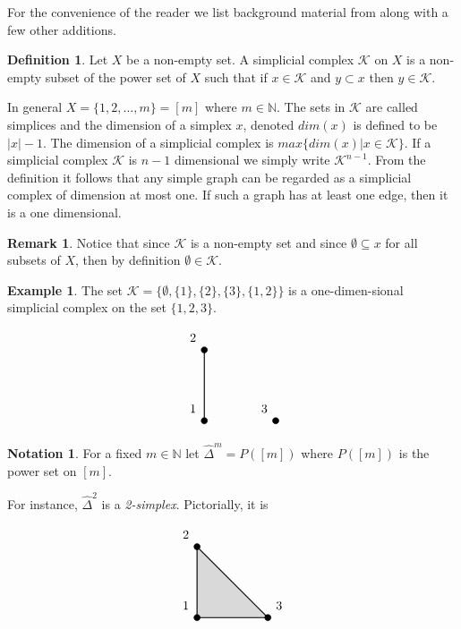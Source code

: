 \documentclass[oneside,12pt]{amsart}
\theoremstyle{definition}
\newtheorem{Definition}[Theorem]{Definition}
\newtheorem{Notation}[Theorem]{Notation}
\newtheorem{Remark}[Theorem]{Remark}
\newtheorem{Example}[Theorem]{Example}
\numberwithin{equation}{section}
\begin{document}
For the convenience of the reader we list background material from \cite{ALDH} along with a few other additions.
\begin{Definition}
Let $X$ be a non-empty set. A simplicial complex $\mathcal{K}$ on $X$ is a non-empty subset of the power set of $X$ such that if $x\in \mathcal{K}$ and $y\subset x$ then $y\in \mathcal{K}$.
\end{Definition}

In general $X=\{1,2,\ldots,m\}=[m]$ where $m\in \mathbb{N}$. The sets in $\mathcal{K}$ are called simplices and the dimension of a simplex $x$, denoted $dim(x)$ is defined to be $|x|-1$. The dimension of a simplicial complex is $max\{dim(x)|x\in \mathcal{K}\}$.  If a simplicial complex $\mathcal{K}$ is $n-1$ dimensional we simply write $\mathcal{K}^{n-1}$.  From the definition it follows that any simple graph can be regarded as a simplicial complex of dimension at most one.  If such a graph has at least one edge, then it is a one dimensional.

\begin{Remark}
Notice that since $\mathcal{K}$ is a non-empty set and since $\emptyset \subseteq x$ for all subsets of $X$, then by definition $\emptyset\in \mathcal{K}$.
\end{Remark}

\begin{Example}\label{E1}
The set $\mathcal{K}=\{\emptyset,\{1\},\{2\},\{3\},\{1,2\}\}$ is a one-dimen-sional simplicial complex on the set $\{1,2,3\}$.\\
\begin{minipage}{\linewidth}
$$\begin{tikzpicture}
\filldraw [black] (-10,0) node[above left =3pt]{$1$} circle (2.5pt);  %
\filldraw [black] (-10,2) node[above left =3pt]{$2$} circle (2.5pt);  %
\draw[thick] (-10,0) -- (-10,2);
\filldraw [black] (-8,0) node[above left =3pt]{$3$} circle (2.5pt);
\end{tikzpicture}$$
        \end{minipage}
\end{Example}

\begin{Notation}
For a fixed $m\in \mathbb{N}$ let $\widehat{\Delta}^m=P([m])$ where $P([m])$ is the power set on $[m]$.
\end{Notation}
 For instance, $\widehat{\Delta}^2$ is a \textit{2-simplex}.  Pictorially, it is

\begin{minipage}{\linewidth}
$$\begin{tikzpicture}
\filldraw[thick,gray!30]  (-10,0) -- (-10,2)--(-8,0)--(-10,0);
\draw[thick]  (-10,0) -- (-10,2)--(-8,0)--(-10,0);
\filldraw [black] (-10,0) node[above left =3pt]{$1$} circle (2.5pt);  %
\filldraw [black] (-10,2) node[above left =3pt]{$2$} circle (2.5pt);  %
\filldraw [black] (-8,0) node[above right =3pt]{$3$} circle (2.5pt);
\end{tikzpicture}$$
        \end{minipage}\\
\end{document}
